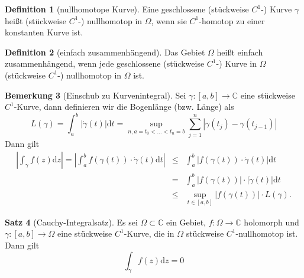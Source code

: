 \documentclass[11pt,titlepage]{article}
\theoremstyle{definition}
\newtheorem{theorem}{Satz}[section]
\newtheorem{definition}[theorem]{Definition}
\newtheorem{remark}[theorem]{Bemerkung}
\theoremstyle{remark}
\begin{document}
	\begin{definition}[nullhomotope Kurve]
		Eine geschlossene (stückweise $C^1$-) Kurve $\gamma$ heißt (stückweise $C^1$-) nullhomotop 
		in $\Omega$, wenn sie $C^1$-homotop zu einer konstanten Kurve ist.
	\end{definition}
	
	\begin{definition}[einfach zusammenhängend]
		Das Gebiet $\Omega$ heißt einfach zusammenhängend, wenn jede geschlossene (stückweise 
		$C^1$-) Kurve in $\Omega$ (stückweise $C^1$-) nullhomotop in $\Omega$ ist.
	\end{definition}
	
	\begin{remark}[Einschub zu Kurvenintegral]
		Sei $\gamma:[a,b]\to\mathbb{C}$ eine stückweise $C^1$-Kurve, dann definieren wir die 
		Bogenlänge (bzw. Länge) als
		\[ L(\gamma)=\int_a^b |\dot{\gamma}(t)|\mathrm{d}t =\sup_{n,a=t_0 <\ldots <t_n =b} 
		\sum_{j=1}^n |\gamma(t_j)-\gamma(t_{j-1})| \]
		Dann gilt
		\begin{eqnarray*}
			\left|\int_{\gamma} f(z)\mathrm{d}z \right| = \left|\int_a^b f(\gamma(t))\cdot 
			\dot{\gamma}(t)\mathrm{d}t \right| 
			&\leq& \int_a^b |f(\gamma(t))\cdot \dot{\gamma}(t) |\mathrm{d}t \\
			&=& \int_a^b |f(\gamma(t))|\cdot |\dot{\gamma}(t)|\mathrm{d}t \\
			&\leq& \sup_{t\in [a,b]} |f(\gamma(t))| \cdot L(\gamma).
		\end{eqnarray*}
	\end{remark}
	
	\begin{theorem}[Cauchy-Integralsatz] \label{thm:CI}
		Es sei $\Omega\subset\mathbb{C}$ ein Gebiet, $f:\Omega\to\mathbb{C}$ holomorph und 
		$\gamma:[a,b]\to\Omega$ eine stückweise $C^1$-Kurve, die in $\Omega$ stückweise 
		$C^1$-nullhomotop ist. Dann gilt 
		\[ \int_{\gamma} f(z) \mathrm{d}z =0 \]
	\end{theorem}
	
\end{document}
